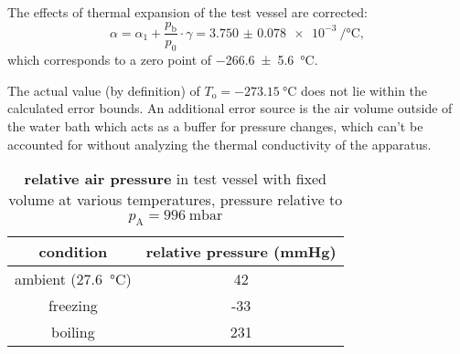 The effects of thermal expansion of the test vessel are corrected:
\begin{equation*}	%
	\alpha = \alpha_1 + \frac{p_\text{b}}{p_0} \cdot \gamma = \SI{3.750(78)e-3}{\per\celsius},
\end{equation*}
which corresponds to a zero point of \SI{-266.6(56)}{\celsius}.

The actual value (by definition) of $T_\text{o} = \SI{-273.15}{\celsius}$ does not lie within the calculated error bounds.
An additional error source is the air volume outside of the water bath which acts as a buffer for pressure changes, which can't be accounted for without analyzing the thermal conductivity of the apparatus.

\begin{table}
	\centering
	\caption{\textbf{relative air pressure} in test vessel with fixed volume at various temperatures, pressure relative to $p_\text{A} = \SI{996}{\milli\bar}$}
	\begin{tabular}{cS}
		\toprule
		condition&
		{relative pressure (\si{\mmHg})}\\
		\midrule
		ambient (\SI{27.6}{\celsius})&	42\\
		freezing&	-33\\
		boiling&	231\\
		\bottomrule
	\end{tabular}
\end{table}
